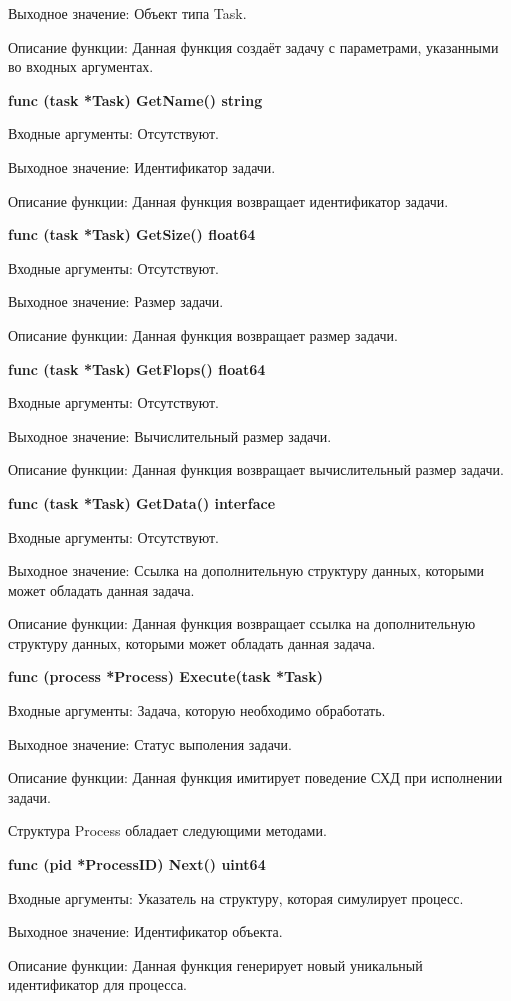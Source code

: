 Выходное значение: Объект типа Task.

Описание функции: Данная функция создаёт задачу с параметрами, указанными во входных аргументах.

\textbf{	func (task *Task) GetName() string }

Входные аргументы: Отсутствуют.

Выходное значение: Идентификатор задачи. 

Описание функции: Данная функция возвращает идентификатор задачи.

\textbf{	func (task *Task) GetSize() float64 }

Входные аргументы: Отсутствуют.

Выходное значение: Размер задачи.

Описание функции: Данная функция возвращает размер задачи.

\textbf{	func (task *Task) GetFlops() float64}

Входные аргументы: Отсутствуют.

Выходное значение: Вычислительный размер задачи.

Описание функции: Данная функция возвращает вычислительный размер задачи.

\textbf{	func (task *Task) GetData() interface{} }

Входные аргументы: Отсутствуют.

Выходное значение: Ссылка на дополнительную структуру данных, которыми может обладать данная задача.

Описание функции: Данная функция возвращает ссылка на дополнительную структуру данных, которыми может обладать данная задача.

\textbf{	func (process *Process) Execute(task *Task) }

Входные аргументы: Задача, которую необходимо обработать.

Выходное значение: Статус выполения задачи.

Описание функции: Данная функция имитирует поведение СХД при исполнении задачи.


Структура Process обладает следующими методами.

\textbf{func (pid *ProcessID) Next() uint64}

Входные аргументы: Указатель на структуру, которая симулирует процесс.

Выходное значение: Идентификатор объекта.

Описание функции: Данная функция генерирует новый уникальный идентификатор для процесса.

